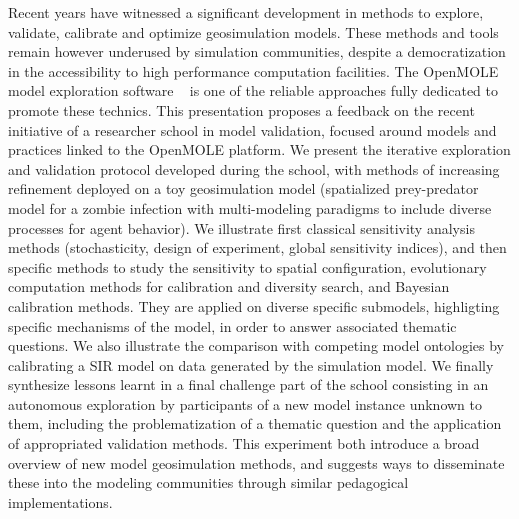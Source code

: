 \documentclass[11pt]{article}
\begin{document}
Recent years have witnessed a significant development in methods to explore, validate, calibrate and optimize geosimulation models. These methods and tools remain however underused by simulation communities, despite a democratization in the accessibility to high performance computation facilities. The OpenMOLE model exploration software ~\citep{reuillon2013openmole} is one of the reliable approaches fully dedicated to promote these technics. This presentation proposes a feedback on the recent initiative of a researcher school in model validation, focused around models and practices linked to the OpenMOLE platform. We present the iterative exploration and validation protocol developed during the school, with methods of increasing refinement deployed on a toy geosimulation model (spatialized prey-predator model for a zombie infection with multi-modeling paradigms to include diverse processes for agent behavior). We illustrate first classical sensitivity analysis methods (stochasticity, design of experiment, global sensitivity indices), and then specific methods to study the sensitivity to spatial configuration, evolutionary computation methods for calibration and diversity search, and Bayesian calibration methods. They are applied on diverse specific submodels, highligting specific mechanisms of the model, in order to answer associated thematic questions. We also illustrate the comparison with competing model ontologies by calibrating a SIR model on data generated by the simulation model. We finally synthesize lessons learnt in a final challenge part of the school consisting in an autonomous exploration by participants of a new model instance unknown to them, including the problematization of a thematic question and the application of appropriated validation methods. This experiment both introduce a broad overview of new model geosimulation methods, and suggests ways to disseminate these into the modeling communities through similar pedagogical implementations.












\end{document}
